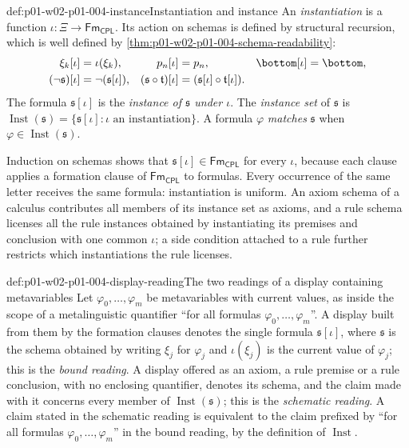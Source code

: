 \begin{hbdefinition}{def:p01-w02-p01-004-instance}{Instantiation and instance}
An \emph{instantiation} is a function
\(\iota:\Xi\to\mathsf{Fm}_{\mathsf{CPL}}\). Its action on schemas is defined
by structural recursion, which is well defined by
\cref{thm:p01-w02-p01-004-schema-readability}:
\[
\begin{aligned}
 \xi_k[\iota]&=\iota(\xi_k),&
 p_n[\iota]&=p_n,&
 \bottom[\iota]&=\bottom,\\
 (\neg\mathfrak s)[\iota]&=\neg(\mathfrak s[\iota]),&
 (\mathfrak s\circ\mathfrak t)[\iota]
   &=(\mathfrak s[\iota]\circ\mathfrak t[\iota]).
\end{aligned}
\]
The formula \(\mathfrak s[\iota]\) is the \emph{instance of \(\mathfrak s\)
under \(\iota\)}. The \emph{instance set} of \(\mathfrak s\) is
\(\operatorname{Inst}(\mathfrak s)=\{\mathfrak s[\iota]:\iota
\text{ an instantiation}\}\). A formula \(\varphi\) \emph{matches}
\(\mathfrak s\) when \(\varphi\in\operatorname{Inst}(\mathfrak s)\).
\end{hbdefinition}

Induction on schemas shows that \(\mathfrak s[\iota]\in
\mathsf{Fm}_{\mathsf{CPL}}\) for every \(\iota\), because each clause applies a
formation clause of \(\mathsf{Fm}_{\mathsf{CPL}}\) to formulas. Every
occurrence of the same letter receives the same formula: instantiation is
uniform. An axiom schema of a calculus contributes all members of its
instance set as axioms, and a rule schema licenses all the rule instances
obtained by instantiating its premises and conclusion with one common
\(\iota\); a side condition attached to a rule further restricts which
instantiations the rule licenses.

\begin{hbconvention}{def:p01-w02-p01-004-display-reading}{The two readings of a display containing metavariables}
Let \(\varphi_0,\ldots,\varphi_{m}\) be metavariables with current values, as
inside the scope of a metalinguistic quantifier ``for all formulas
\(\varphi_0,\ldots,\varphi_m\)''. A display built from them by the formation
clauses denotes the single formula \(\mathfrak s[\iota]\), where
\(\mathfrak s\) is the schema obtained by writing \(\xi_j\) for
\(\varphi_j\) and \(\iota(\xi_j)\) is the current value of \(\varphi_j\); this
is the \emph{bound reading}. A display offered as an axiom, a rule premise or
a rule conclusion, with no enclosing quantifier, denotes its schema, and the
claim made with it concerns every member of \(\operatorname{Inst}(\mathfrak
s)\); this is the \emph{schematic reading}. A claim stated in the schematic
reading is equivalent to the claim prefixed by ``for all formulas
\(\varphi_0,\ldots,\varphi_m\)'' in the bound reading, by the definition of
\(\operatorname{Inst}\).
\end{hbconvention}

